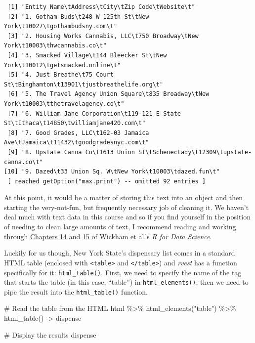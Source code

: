 \documentclass[
  letterpaper,
]{book}
\newenvironment{Shaded}{\begin{snugshade}}{\end{snugshade}}
\newcommand{\CommentTok}[1]{\textcolor[rgb]{0.37,0.37,0.37}{#1}}
\newcommand{\FunctionTok}[1]{\textcolor[rgb]{0.28,0.35,0.67}{#1}}
\newcommand{\NormalTok}[1]{\textcolor[rgb]{0.00,0.23,0.31}{#1}}
\newcommand{\OtherTok}[1]{\textcolor[rgb]{0.00,0.23,0.31}{#1}}
\newcommand{\SpecialCharTok}[1]{\textcolor[rgb]{0.37,0.37,0.37}{#1}}
\newcommand{\StringTok}[1]{\textcolor[rgb]{0.13,0.47,0.30}{#1}}
\begin{document}
\begin{verbatim}
 [1] "Entity Name\tAddress\tCity\tZip Code\tWebsite\t"                                       
 [2] "1. Gotham Buds\t248 W 125th St\tNew York\t10027\tgothambudsny.com\t"                   
 [3] "2. Housing Works Cannabis, LLC\t750 Broadway\tNew York\t10003\thwcannabis.co\t"        
 [4] "3. Smacked Village\t144 Bleecker St\tNew York\t10012\tgetsmacked.online\t"             
 [5] "4. Just Breathe\t75 Court St\tBinghamton\t13901\tjustbreathelife.org\t"                
 [6] "5. The Travel Agency Union Square\t835 Broadway\tNew York\t10003\tthetravelagency.co\t"
 [7] "6. William Jane Corporation\t119-121 E State St\tIthaca\t14850\twilliamjane420.com\t"  
 [8] "7. Good Grades, LLC\t162-03 Jamaica Ave\tJamaica\t11432\tgoodgradesnyc.com\t"          
 [9] "8. Upstate Canna Co\t1613 Union St\tSchenectady\t12309\tupstate-canna.co\t"            
[10] "9. Dazed\t33 Union Sq. W\tNew York\t10003\tdazed.fun\t"                                
 [ reached getOption("max.print") -- omitted 92 entries ]
\end{verbatim}

At this point, it would be a matter of storing this text into an object
and then starting the very-not-fun, but frequently necessary job of
cleaning it. We haven't deal much with text data in this course and so
if you find yourself in the position of needing to clean large amounts
of text, I recommend reading and working through
\href{https://r4ds.hadley.nz/strings}{Chapters 14} and
\href{https://r4ds.hadley.nz/regexps}{15} of Wickham et al.'s \emph{R
for Data Science}.

Luckily for us though, New York State's dispensary list comes in a
standard HTML table (enclosed with
\texttt{\textless{}table\textgreater{}} and
\texttt{\textless{}/table\textgreater{}}) and \emph{rvest} has a
function specifically for it: \texttt{html\_table()}. First, we need to
specify the name of the tag that starts the table (in this case,
``table'') in \texttt{html\_elements()}, then we need to pipe the result
into the \texttt{html\_table()} function.

\begin{Shaded}
\begin{Highlighting}[]
\CommentTok{\# Read the table from the HTML}
\NormalTok{html }\SpecialCharTok{\%\textgreater{}\%}
  \FunctionTok{html\_elements}\NormalTok{(}\StringTok{"table"}\NormalTok{) }\SpecialCharTok{\%\textgreater{}\%}
  \FunctionTok{html\_table}\NormalTok{() }\OtherTok{{-}\textgreater{}}\NormalTok{ dispense}

\CommentTok{\# Display the results}
\NormalTok{dispense}
\end{Highlighting}
\end{Shaded}
\end{document}
